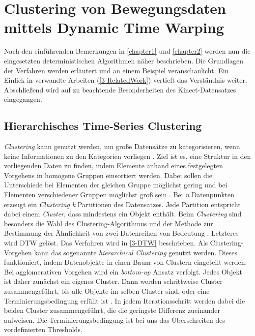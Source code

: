 \chapter{Clustering von Bewegungsdaten mittels Dynamic Time Warping}
\label{chapter3}

Nach den einführenden Bemerkungen in \autoref{chapter1} und \autoref{chapter2} werden nun
die eingesetzten deterministischen Algorithmen näher beschrieben.
Die Grundlagen der Verfahren werden erläutert und an einem Beispiel veranschaulicht.
Ein Einlick in verwandte Arbeiten (\autoref{3-RelatedWork}) vertieft das Verständnis weiter.
Abschließend wird auf zu beachtende Besonderheiten des Kinect-Datensatzes eingegangen.


\section{Hierarchisches Time-Series Clustering}
\label{3-Clustering}
\emph{Clustering} kann genutzt werden, um große Datensätze zu kategorisieren,
wenn keine Informationen zu den Kategorien vorliegen \citep{aghabozorgi_time-series_2015}.
Ziel ist es, eine Struktur in den vorliegenden Daten zu finden,
indem Elemente anhand eines festgelegten Vorgehens in homogene Gruppen einsortiert werden.
Dabei sollen die Unterschiede bei Elementen der gleichen Gruppe möglichst gering
und bei Elementen verschiedener Gruppen möglichst groß sein \citep{aghabozorgi_time-series_2015, warren_liao_clustering_2005}.
Bei \emph{n} Datenpunkten erzeugt ein \emph{Clustering} \emph{k} Partitionen des Datensatzes.
Jede Partition entspricht dabei einem \emph{Cluster}, dass mindestens ein Objekt enthält.
Beim \emph{Clustering} sind besonders die Wahl des Clustering-Algorithmus
und der Methode zur Bestimmung der Ähnlichkeit von zwei Datenreihen von Bedeutung \citep{warren_liao_clustering_2005}.
Letzteres wird \ac{DTW} gelöst.
Das Verfahren wird in \autoref{3-DTW} beschrieben.
Als Clustering-Vorgehen kann das sogenannte \emph{hierarchical Clustering} genutzt werden.
Dieses funktioniert, indem Datenobjekte in einen Baum von Clustern eingeteilt werden.
Bei agglomerativen Vorgehen wird ein \emph{bottom-up} Ansatz verfolgt.
Jedes Objekt ist daher zunächst ein eigenes Cluster.
Dann werden schrittweise Cluster zusammengeführt,
bis alle Objekte im selben Cluster sind, oder eine Terminierungsbedingung erfüllt ist \citep{warren_liao_clustering_2005}.
In jedem Iterationsschritt werden dabei die beiden Cluster zusammengeführt,
die die geringste Differenz zueinander aufweisen.
Die Terminierungsbedingung ist bei uns das Überschreiten des vordefinierten Thresholds.

